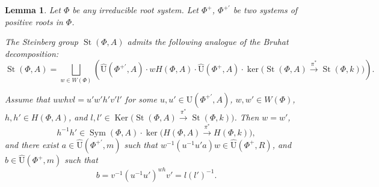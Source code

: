 \documentclass[oneside, 10pt]{amsart}
\DeclareMathOperator{\St}{St}
\DeclareMathOperator{\Sym}{Sym}
\DeclareMathOperator{\Ker}{Ker}
\newcommand{\UU}{\hat{\mathrm{U}}}      %
\numberwithin{equation}{section}
\newtheorem{lemma}{Lemma}
\numberwithin{lemma}{section}
\theoremstyle{definition}
\theoremstyle{remark}
\begin{document}
\begin{lemma}\label{lem:bruhat}
Let $\Phi$ be any irreducible root system.
Let $\Phi^+$, $\Phi^{+'}$ be two systems of positive roots in $\Phi$.
 \begin{lemlist}
\item  The Steinberg group
$\St(\Phi,A)$ admits the following analogue of the Bruhat decomposition:
\begin{equation}\label{eq:bruhat}
\St(\Phi,A) =\bigsqcup_{w\in W(\Phi)} \left(\UU(\Phi^{+'}, A)\cdot wH(\Phi,A)\cdot\UU(\Phi^+, A) \cdot
\ker\bigl(\St(\Phi,A) \xrightarrow{\pi^*} \St(\Phi,k)\bigr)\right).
\end{equation}
\item Assume that $uwhvl=u'w'h'v'l'$ for some $u,u'\in \UU(\Phi^{+'}, A)$, $w,w'\in W(\Phi)$,
$h,h'\in H(\Phi,A)$, and $l,l'\in \Ker\bigl(\St(\Phi,A) \xrightarrow{\pi^*} \St(\Phi,k)\bigr)$. Then
$w=w'$,
$$
h^{-1}h'\in \Sym(\Phi,A)\cdot\ker\bigl(H(\Phi,A) \xrightarrow{\pi^*} H(\Phi,k)\bigr),
$$
and
there exist $a\in \UU(\Phi^{+'},m)$ such that $w^{-1}(u^{-1}u'a)w\in \UU(\Phi^+,R)$,
and $b\in\UU(\Phi^+,m)$ such that
$$
b=v^{-1}(u^{-1}u')^{wh}v'=l(l')^{-1}.
$$
 \end{lemlist}
\end{lemma}


\begin{comment}
\subsection{Various stuff}
\[ T_{ij}(at^{-1}) = \sigma_i T_{ij}(a) \sigma_i^{-1} = \sigma_j^{-1} T_{ij}(a) \sigma_j \]
\[ [[x_{ij}(a t^{-1}), x_{jk}(b t^{-1})],  x_{kl}(c)] = [x_{ik}(a b t^{-1}),  x_{kl}(c t^{-1})] \]
\[ \sigma_i [[x_{ij}(a), x_{jk}(b t^{-1})],  x_{kl}(c)] \sigma_i^{-1} =  \sigma_i [x_{ik}(a b),  x_{kl}(c t^{-1})] \sigma_i^{-1} \]
\begin{multline}
[[x_{ij}(at^{-1}), x_{jk}(bt^{-1})], x_{jl}(ct^{-1})] = \sigma_i [[ x_{ij}(a), x_{jk}(bt^{-1})], x_{jl}(ct^{-1})] \sigma_i^{-1} = \\
\sigma_i \sigma_k^{-1} \sigma_l^{-1} [[ x_{ij}(a), x_{jk}(b)], x_{jl}(c)] \sigma_l \sigma_k \sigma_i^{-1} = 1
\end{multline}
\[ [b, c] =1,\ [a^c, b] = c^{-1} a c b c^{-1} a^{-1} c b^{-1} =  c^{-1} a b  a^{-1} b^{-1} c = [a, b]^c \]

We need to prove that $\sigma_i$ commute with $x_{jk}(a)$ if $j\neq i, k \neq i$.
\end{comment}
\end{document}
